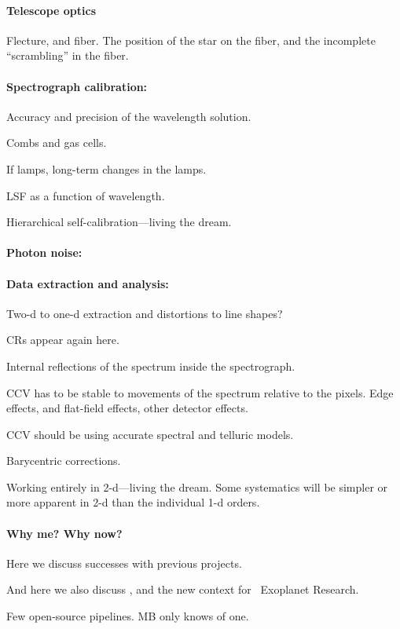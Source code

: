 \documentclass[12pt, fullpage, letterpaper]{article}
\begin{document}
\paragraph{Telescope optics}
Flecture, and fiber. The position of the star on the fiber, and the
incomplete ``scrambling'' in the fiber.

\paragraph{Spectrograph calibration:}
Accuracy and precision of the wavelength solution.

Combs and gas cells.

If lamps, long-term changes in the lamps.

LSF as a function of wavelength.

Hierarchical self-calibration---living the dream.

\paragraph{Photon noise:}

\paragraph{Data extraction and analysis:}
Two-d to one-d extraction and distortions to line shapes?

CRs appear again here.

Internal reflections of the spectrum inside the spectrograph.

CCV has to be stable to movements of the spectrum relative to the
pixels. Edge effects, and flat-field effects, other detector effects.

CCV should be using accurate spectral and telluric models.

Barycentric corrections.

Working entirely in 2-d---living the dream. Some systematics will be
simpler or more apparent in 2-d than the individual 1-d orders.

\paragraph{Why me? Why now?}
Here we discuss successes with previous projects.

And here we also discuss \NNEXPLORE, and the new context for
\NASA\ Exoplanet Research.

Few open-source pipelines. MB only knows of one.
\end{document}
